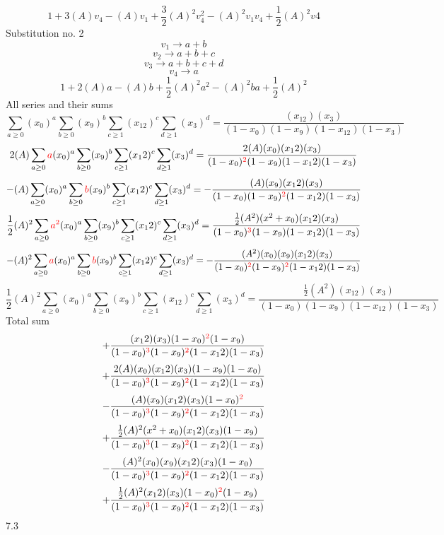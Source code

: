 \documentclass{article}
\begin{document}
\[1+3(A)v_4-(A)v_1+\frac{3}{2}(A)^2v_4^{2}-(A)^2v_1v_4+\frac{1}{2}(A)^2v4\]Substitution no. 2\[v_1\rightarrow{a+b}\]\[v_2\rightarrow{a+b+c}\]\[v_3\rightarrow{a+b+c+d}\]\[v_4\rightarrow{a}\]\[1+2(A)a-(A)b+\frac{1}{2}(A)^2a^{2}-(A)^2ba+\frac{1}{2}(A)^2\]All series and their sums\[\sum_{a\geq{0}}(x_0)^{a}\sum_{b\geq{0}}(x_9)^{b}\sum_{c\geq{1}}(x_12)^{c}\sum_{d\geq{1}}(x_3)^{d}=\frac{(x_12)(x_3)}{(1-x_0)(1-x_9)(1-x_12)(1-x_3)}\]\[2(A)\sum_{a\geq{0}}\textcolor{red}{a}(x_0)^{a}\sum_{b\geq{0}}(x_9)^{b}\sum_{c\geq{1}}(x_12)^{c}\sum_{d\geq{1}}(x_3)^{d}=\frac{2(A)(x_0)(x_12)(x_3)}{(1-x_0)^{\textcolor{red}{2}}(1-x_9)(1-x_12)(1-x_3)}\]\[-(A)\sum_{a\geq{0}}(x_0)^{a}\sum_{b\geq{0}}\textcolor{red}{b}(x_9)^{b}\sum_{c\geq{1}}(x_12)^{c}\sum_{d\geq{1}}(x_3)^{d}=-\frac{(A)(x_9)(x_12)(x_3)}{(1-x_0)(1-x_9)^{\textcolor{red}{2}}(1-x_12)(1-x_3)}\]\[\frac{1}{2}(A)^{2}\sum_{a\geq{0}}\textcolor{red}{a^{2}}(x_0)^{a}\sum_{b\geq{0}}(x_9)^{b}\sum_{c\geq{1}}(x_12)^{c}\sum_{d\geq{1}}(x_3)^{d}=\frac{\frac{1}{2}(A^{2})(x^{2}+x_0)(x_12)(x_3)}{(1-x_0)^{\textcolor{red}{3}}(1-x_9)(1-x_12)(1-x_3)}\]\[-(A)^{2}\sum_{a\geq{0}}\textcolor{red}{a}(x_0)^{a}\sum_{b\geq{0}}\textcolor{red}{b}(x_9)^{b}\sum_{c\geq{1}}(x_12)^{c}\sum_{d\geq{1}}(x_3)^{d}=-\frac{(A^{2})(x_0)(x_9)(x_12)(x_3)}{(1-x_0)^{\textcolor{red}{2}}(1-x_9)^{\textcolor{red}{2}}(1-x_12)(1-x_3)}\]\[\frac{1}{2}(A)^{2}\sum_{a\geq{0}}(x_0)^{a}\sum_{b\geq{0}}(x_9)^{b}\sum_{c\geq{1}}(x_12)^{c}\sum_{d\geq{1}}(x_3)^{d}=\frac{\frac{1}{2}(A^{2})(x_12)(x_3)}{(1-x_0)(1-x_9)(1-x_12)(1-x_3)}\]
Total sum
\[+\frac{(x_12)(x_3)(1-x_0)^{\textcolor{red}{2}}(1-x_9)}{(1-x_0)^{\textcolor{red}{3}}(1-x_9)^{\textcolor{red}{2}}(1-x_12)(1-x_3)}\]\[+\frac{2(A)(x_0)(x_12)(x_3)(1-x_9)(1-x_0)}{(1-x_0)^{\textcolor{red}{3}}(1-x_9)^{\textcolor{red}{2}}(1-x_12)(1-x_3)}\]\[-\frac{(A)(x_9)(x_12)(x_3)(1-x_0)^{\textcolor{red}{2}}}{(1-x_0)^{\textcolor{red}{3}}(1-x_9)^{\textcolor{red}{2}}(1-x_12)(1-x_3)}\]\[+\frac{\frac{1}{2}(A)^{2}(x^{2}+x_0)(x_12)(x_3)(1-x_9)}{(1-x_0)^{\textcolor{red}{3}}(1-x_9)^{\textcolor{red}{2}}(1-x_12)(1-x_3)}\]\[-\frac{(A)^{2}(x_0)(x_9)(x_12)(x_3)(1-x_0)}{(1-x_0)^{\textcolor{red}{3}}(1-x_9)^{\textcolor{red}{2}}(1-x_12)(1-x_3)}\]\[+\frac{\frac{1}{2}(A)^{2}(x_12)(x_3)(1-x_0)^{\textcolor{red}{2}}(1-x_9)}{(1-x_0)^{\textcolor{red}{3}}(1-x_9)^{\textcolor{red}{2}}(1-x_12)(1-x_3)}\]
7.3
\end{document}
